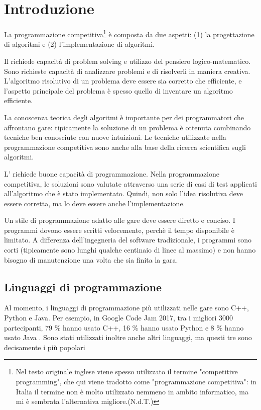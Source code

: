 \chapter{Introduzione}

La programmazione competitiva\footnote{Nel testo originale inglese viene spesso utilizzato il termine "competitive programming", che qui viene tradotto come "programmazione competitiva": in Italia il termine non è molto utilizzato nemmeno in ambito  informatico, ma mi è sembrata l'alternativa migliore.(N.d.T.)}  è composta da due aspetti:
(1) la progettazione di algoritmi e (2) l'implementazione di algoritmi.

Il  richiede capacità di problem solving
e utilizzo del pensiero logico-matematico.
Sono richieste capacità di analizzare problemi e di 
risolverli in maniera creativa.
L'algoritmo risolutivo di un problema
deve essere sia corretto che efficiente,
e l'aspetto principale del problema è spesso
quello di inventare un algoritmo efficiente.

La conoscenza teorica degli algoritmi è
importante per dei programmatori che affrontano gare:
tipicamente la soluzione di un problema è ottenuta 
combinando tecniche ben conosciute con nuove intuizioni.
Le tecniche utilizzate nella programmazione competitiva
sono anche alla base della ricerca scientifica sugli
algoritmi.

L' richiede buone
capacità di programmazione.
Nella programmazione competitiva, le soluzioni sono valutate
attraverso una serie di casi di test applicati all'algoritmo 
che è stato implementato.
Quindi, non solo l'idea risolutiva deve essere corretta,
ma lo deve essere anche l'implementazione.

Un stile di programmazione adatto alle gare
deve essere diretto e conciso.
I programmi dovono essere scritti velocemente,
perchè il tempo disponibile è limitato.
A differenza dell'ingegneria del software tradizionale,
i programmi sono corti (tipicamente sono lunghi qualche
centinaio di linee al massimo) e non hanno bisogno
di manutenzione una volta che sia finita la gara.

\section{Linguaggi di programmazione}


Al momento, i linguaggi di programmazione più utilizzati 
nelle gare sono C++, Python e Java.
Per esempio, in Google Code Jam 2017,
tra i migliori 3000 partecipanti,
79 \% hanno usato C++,
16 \% hanno usato Python e
8 \% hanno usato Java \cite{goo17}.
Sono stati utilizzati inoltre anche altri linguaggi, 
ma questi tre sono decisamente i più popolari


